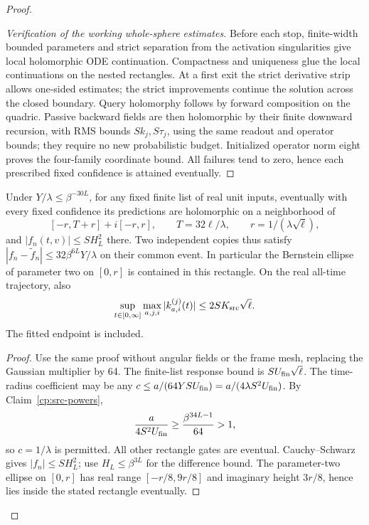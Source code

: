 \begin{proof}
\begin{proof}[Verification of the working whole-sphere estimates]
Before each stop, finite-width bounded parameters and strict separation
from the activation singularities give local holomorphic ODE
continuation.  Compactness and uniqueness glue the local continuations
on the nested rectangles.  At a first exit the strict derivative strip
allows one-sided estimates; the strict improvements continue the
solution across the closed boundary.  Query holomorphy follows by
forward composition on the quadric.  Passive backward fields are then
holomorphic by their finite downward recursion, with RMS bounds
\(Sk_j,S\tau_j\), using the same readout and operator bounds;
they require no new probabilistic budget.  Initialized operator norm
eight proves the four-family coordinate bound.  All failures tend to
zero, hence each prescribed fixed confidence is attained eventually.
\end{proof}

\begin{claim}
\label{cp:src-finite-working}
Under \(Y/\lambda\le\beta^{-30L}\), for any fixed finite list of
real unit inputs, eventually with every fixed confidence its predictions
are holomorphic on a neighborhood of
\[
 [-r,T+r]+i[-r,r],\qquad
 T=32\ell/\lambda,\qquad r=1/(\lambda\sqrt\ell),
\]
and \(|f_n(t,v)|\le SH_L^2\) there.  Two independent copies thus
satisfy \(|f_n-\widetilde f_n|\le32\beta^{6L}Y/\lambda\)
on their common event.  In particular the Bernstein ellipse of
parameter two on \([0,r]\) is contained in this rectangle.
On the real all-time trajectory, also
\begin{equation}
 \sup_{t\in[0,\infty]}\max_{a,j,i}|k_{a,i}^{(j)}(t)|
               \le2SK_{\rm src}\sqrt\ell.
 \label{cp:src-carrier-working}
\end{equation}
The fitted endpoint is included.
\end{claim}
\begin{proof}
Use the same proof without angular fields or the frame mesh, replacing
the Gaussian multiplier by 64.  The finite-list response bound is
\(SU_{\rm fin}\sqrt\ell\).  The time-radius coefficient may be any
\(c\le a/(64YSU_{\rm fin})=a/(4\lambda S^2U_{\rm fin})\).
By Claim~\ref{cp:src-powers},
\[
 \frac a{4S^2U_{\rm fin}}
 \ge\frac{\beta^{34L-1}}{64}>1,
\]
so \(c=1/\lambda\) is permitted.  All other rectangle gates are
eventual.  Cauchy--Schwarz gives \(|f_n|\le SH_L^2\); use
\(H_L\le\beta^{3L}\) for the difference bound.  The parameter-two
ellipse on \([0,r]\) has real range \([-r/8,9r/8]\) and imaginary
height \(3r/8\), hence lies inside the stated rectangle eventually.


\end{proof}
\end{proof}
